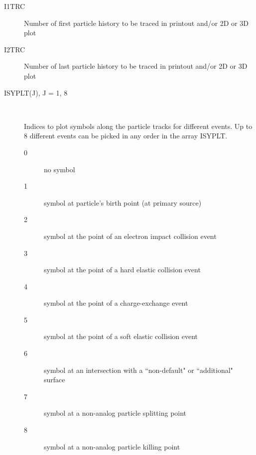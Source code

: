 \begin{description}
  \item[I1TRC] Number of first particle history to be traced in printout and/or
        2D or 3D plot
  \item[I2TRC] Number of last particle history to be traced in
        printout and/or 2D or 3D plot
  \item[ISYPLT(J), J = 1, 8] ~ 

        Indices to plot symbols along the particle tracks for different events.
        Up to 8 different events can be picked in any order in the array ISYPLT.
        \begin{description}
          \item[0] no symbol
          \item[1] symbol at particle's birth point (at primary
                source)
          \item[2] symbol at the point of an electron impact collision event
          \item[3] symbol at the point of a hard elastic collision event
          \item[4] symbol
                at the point of a charge-exchange event
          \item[5] symbol at the point of a soft
                elastic collision event
          \item[6] symbol at an intersection with a
                ``non-default" or ``additional" surface
          \item[7] symbol at a non-analog
                particle splitting point
          \item[8] symbol at a non-analog particle killing point


\end{description}
\end{description}
